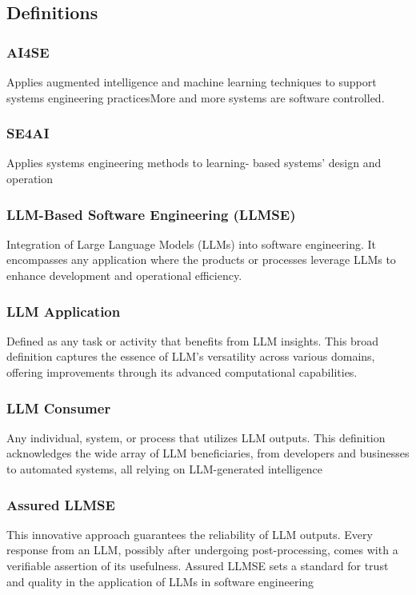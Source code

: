 \subsection{Definitions}

\subsubsection{AI4SE} Applies augmented intelligence and machine learning
techniques to support systems engineering practicesMore and more
systems are software controlled.

\subsubsection{SE4AI} Applies systems engineering methods to learning- based
systems' design and operation

\subsubsection{LLM-Based Software Engineering (LLMSE)}
Integration of Large Language Models (LLMs) into software engineering.
It encompasses any application where the products or processes leverage LLMs to
enhance development and operational efficiency.

\subsubsection{LLM Application}
Defined as any task or activity that benefits from
LLM insights. This broad definition captures the essence of LLM's
versatility across various domains, offering improvements through its
advanced computational capabilities.

\subsubsection{LLM Consumer}
Any individual, system, or process that utilizes LLM
outputs. This definition acknowledges the wide array of LLM
beneficiaries, from developers and businesses to automated systems,
all relying on LLM-generated intelligence

\subsubsection{Assured LLMSE}
This innovative approach guarantees the reliability of
LLM outputs. Every response from an LLM, possibly after undergoing
post-processing, comes with a verifiable assertion of its usefulness.
Assured LLMSE sets a standard for trust and quality in the application
of LLMs in software engineering

